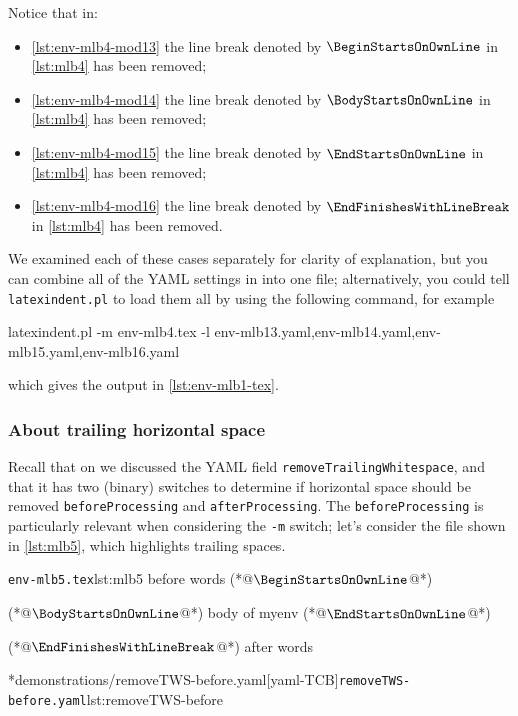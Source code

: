 	Notice that in: \begin{itemize} \item \cref{lst:env-mlb4-mod13} the line break denoted by $\BeginStartsOnOwnLine$ in \cref{lst:mlb4} has been removed;
		\item \cref{lst:env-mlb4-mod14} the line break denoted by $\BodyStartsOnOwnLine$ in \cref{lst:mlb4} has been removed;
		\item \cref{lst:env-mlb4-mod15} the line break denoted by $\EndStartsOnOwnLine$ in \cref{lst:mlb4} has been removed;
		\item \cref{lst:env-mlb4-mod16} the line break denoted by $\EndFinishesWithLineBreak$ in \cref{lst:mlb4} has been removed.
	\end{itemize}
	We examined each of these cases separately for clarity of explanation, but you can combine all of the YAML settings in  into one file; alternatively, you could tell \texttt{latexindent.pl} to load them all by using the following command, for example \begin{widepage} \begin{commandshell}
latexindent.pl -m env-mlb4.tex -l env-mlb13.yaml,env-mlb14.yaml,env-mlb15.yaml,env-mlb16.yaml
\end{commandshell} \end{widepage} which gives the output in \vref{lst:env-mlb1-tex}.

\subsubsection{About trailing horizontal space}
	Recall that on  we discussed the YAML field \texttt{removeTrailingWhitespace}, and that it has two (binary) switches to determine if horizontal space should be removed \texttt{beforeProcessing} and \texttt{afterProcessing}.
	The \texttt{beforeProcessing} is particularly relevant when considering the \texttt{-m} switch; let's consider the file shown in \cref{lst:mlb5}, which highlights trailing spaces.

	\begin{minipage}{.45\linewidth}
		\begin{cmhlistings}[style=tcblatex,showspaces=true,escapeinside={(*@}{@*)}]{\texttt{env-mlb5.tex}}{lst:mlb5}
before words   (*@$\BeginStartsOnOwnLine$@*) 
\begin{myenv}           (*@$\BodyStartsOnOwnLine$@*)
body of myenv      (*@$\EndStartsOnOwnLine$@*) 
\end{myenv}     (*@$\EndFinishesWithLineBreak$@*)
after words
\end{cmhlistings}
	\end{minipage}
	\hfill
	\begin{minipage}{.45\linewidth}
		\cmhlistingsfromfile[style=yaml-LST]*{demonstrations/removeTWS-before.yaml}[yaml-TCB]{\texttt{removeTWS-before.yaml}}{lst:removeTWS-before}
	\end{minipage}

